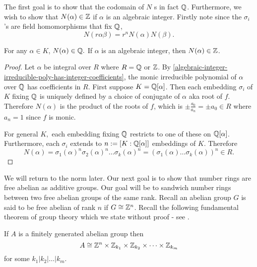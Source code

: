 The first goal is to show that the codomain of $N$ s in fact $\mathbb{Q}$. Furthermore, we wish to show that  $N(\alpha)\in \mathbb{Z}$ if $\alpha$ is an algebraic integer. Firstly note since the $\sigma_i$'s are field homomorphisms that fix $\mathbb{Q}$, $$N(r\alpha\beta)=r^nN(\alpha)N(\beta).$$

\begin{lemma}\label{norm-of-alg-int-is-integer}
For any $\alpha\in K$, $N(\alpha)\in \mathbb{Q}.$ If $\alpha$ is an algebraic integer, then $N(\alpha)\in \mathbb{Z}$.
\end{lemma}
\begin{proof}
Let $\alpha$ be integral over $R$ where $R=\mathbb{Q}$ or $\mathbb{Z}$. By \cref{algebraic-integer-irreducible-poly-has-integer-coefficients}, the monic irreducible polynomial of $\alpha$ over $\mathbb{Q}$ has coefficients in $R$. First suppose $K=\mathbb{Q}[\alpha]$. Then each embedding $\sigma_i$ of $K$ fixing $\mathbb{Q}$ is uniquely defined by a choice of conjugate of $\alpha$ aka root of $f$. Therefore $N(\alpha)$ is the product of the roots of $f$, which is $\pm\frac{a_0}{a_n}=\pm a_0\in R$ where $a_n=1$ since $f$ is monic.

For general $K,$ each embedding fixing $\mathbb{Q}$ restricts to one of these on $\mathbb{Q}[\alpha]$. Furthermore, each $\sigma_i$ extends to $n:=[K:\mathbb{Q}[\alpha]]$ embeddings of $K$. Therefore 
$$N(\alpha)=\sigma_1(\alpha)^n\sigma_2(\alpha)^n\dots\sigma_k(\alpha)^n=(\sigma_1(\alpha)\dots\sigma_k(\alpha))^n\in R.$$
\end{proof}


We will return to the norm later. Our next goal is to show that number rings are free abelian as additive groups. Our goal will be to sandwich number rings between two free abelian groups of the same rank. Recall an abelian group $G$ is said to be free abelian of rank $n$ if $G\cong \mathbb{Z}^n$. Recall the following fundamental theorem of group theory which we state without proof - see \cite{GroupTheory}.

\begin{theorem}
If $A$ is a finitely generated abelian group then
$$A\cong \mathbb{Z}^n\times\mathbb{Z}_{k_1}\times \mathbb{Z}_{k_2}\times \dots \times \mathbb{Z}_{k_m}$$
for some $k_1|k_2|\dots|k_m$.
\end{theorem}

